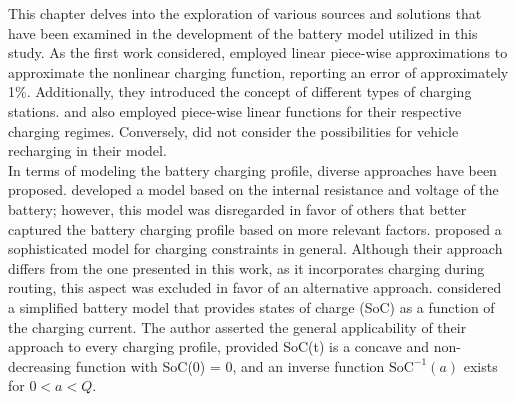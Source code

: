 %
%
This chapter delves into the exploration of various sources and solutions that have been examined in the development of the battery model utilized in this study. As the first work considered,  employed linear piece-wise approximations to approximate the nonlinear charging function, reporting an error of approximately 1\%. Additionally, they introduced the concept of different types of charging stations.  and  also employed piece-wise linear functions for their respective charging regimes. Conversely,  did not consider the possibilities for vehicle recharging in their model.\\
In terms of modeling the battery charging profile, diverse approaches have been proposed.  developed a model based on the internal resistance and voltage of the battery; however, this model was disregarded in favor of others that better captured the battery charging profile based on more relevant factors.  proposed a sophisticated model for charging constraints in general. Although their approach differs from the one presented in this work, as it incorporates charging during routing, this aspect was excluded in favor of an alternative approach.  considered a simplified battery model that provides states of charge (SoC) as a function of the charging current. The author asserted the general applicability of their approach to every charging profile, provided SoC(t) is a concave and non-decreasing function with SoC(0) = 0, and an inverse function $\text{SoC}^{-1}(a)$ exists for $0 < a < Q$.\\
